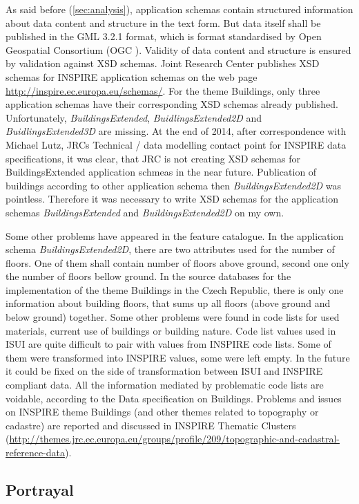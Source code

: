 \documentclass[eprint]{actapoly}
\begin{document}
As said before (\ref{sec:analysis}), application schemas contain structured information about data content and structure in the text form. But data itself shall be published in the GML 3.2.1 format, which is format standardised by Open Geospatial Consortium (OGC \cite{OGC:GML}). Validity of data content and structure is ensured by validation against XSD schemas. Joint Research Center publishes XSD schemas for INSPIRE application schemas on the web page \url{http://inspire.ec.europa.eu/schemas/}. For the theme Buildings, only three application schemas have their corresponding XSD schemas already published. Unfortunately, \textit{BuildingsExtended}, \textit{BuidlingsExtended2D} and \textit{BuidlingsExtended3D} are missing. At the end of 2014, after correspondence with Michael Lutz, JRCs Technical / data modelling contact point for INSPIRE data specifications, it was clear, that JRC is not creating XSD schemas for BuildingsExtended application schmeas in the near future. Publication of buildings according to other application schema then \textit{BuildingsExtended2D} was pointless. Therefore it was necessary to write XSD schemas for the application schemas \textit{BuildingsExtended} and \textit{BuildingsExtended2D} on my own.

Some other problems have appeared in the feature catalogue. In the application schema \textit{BuildingsExtended2D}, there are two attributes used for the number of floors. One of them shall contain number of floors above ground, second one only the number of floors bellow ground. In the source databases for the implementation of the theme Buildings in the Czech Republic, there is only one information about building floors, that sums up all floors (above ground and below ground) together. Some other problems were found in code lists for used materials, current use of buildings or building nature. Code list values used in ISUI are quite difficult to pair with values from INSPIRE code lists. Some of them were transformed into INSPIRE values, some were left empty. In the future it could be fixed on the side of transformation between ISUI and INSPIRE compliant data. All the information mediated by problematic code lists are voidable, according to the Data specification on Buildings. Problems and issues on INSPIRE theme Buildings (and other themes related to topography or cadastre) are reported and discussed in INSPIRE Thematic Clusters (\url{http://themes.jrc.ec.europa.eu/groups/profile/209/topographic-and-cadastral-reference-data}).

\subsection{Portrayal}
\label{sec:portrayal}
\end{document}
